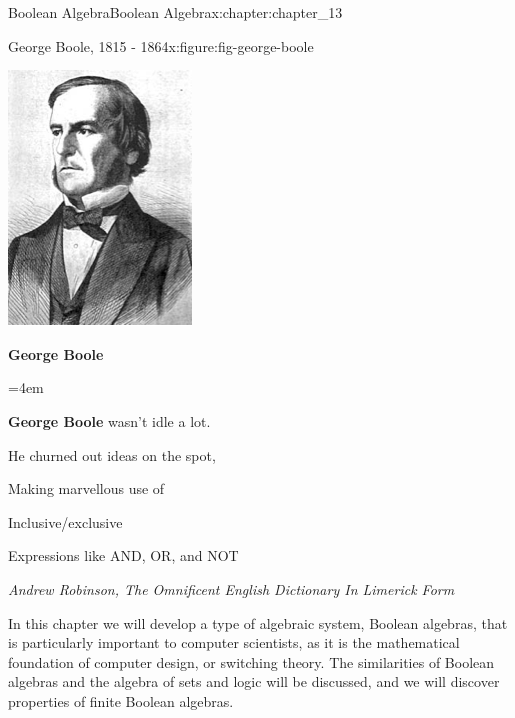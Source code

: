 \documentclass[oneside,10pt,]{book}
\newcommand{\terminology}[1]{\textbf{#1}}
\numberwithin{equation}{section}
\newenvironment{poem}{\setlength{\parindent}{0em}}{}
\newcommand{\poemTitle}[1]{\begin{center}\large\textbf{#1}\end{center}}
\newenvironment{stanza}{\vspace{0.25 em}\hangindent=4em}{\vspace{1 em}}
\newcommand{\poemauthorleft}[1]{\vspace{-1em}\begin{flushleft}\textit{#1}\end{flushleft}}
\newcommand{\poemlineleft}[1]{{\raggedright{#1}\par}\vspace{-\parskip}}
\begin{document}
\begin{chapterptx}{Boolean Algebra}{}{Boolean Algebra}{}{}{x:chapter:chapter_13}
\begin{introduction}{}
\begin{figureptx}{George Boole, 1815 - 1864}{x:figure:fig-george-boole}{}
\begin{image}{0}{1}{0}
\includegraphics[width=\linewidth]{images/fig-george-boole.png}
\end{image}%
\tcblower
\end{figureptx}%
\begin{poem}%
\poemTitle{George Boole}
\begin{stanza}
\poemlineleft{\terminology{George Boole} wasn't idle a lot.}
\poemlineleft{He churned out ideas on the spot,}
\poemlineleft{Making marvellous use of}
\poemlineleft{Inclusive\slash{}exclusive}
\poemlineleft{Expressions like AND, OR, and NOT}
\end{stanza}
\poemauthorleft{Andrew Robinson, The Omnificent English Dictionary In Limerick Form}
\end{poem}
In this chapter we will develop a type of algebraic system, Boolean algebras, that is particularly important to computer scientists, as it is the mathematical foundation of computer design, or switching theory. The similarities of Boolean algebras and the algebra of sets and logic will be discussed, and we will discover properties of finite Boolean algebras.%

\end{introduction}
\end{chapterptx}
\end{document}
